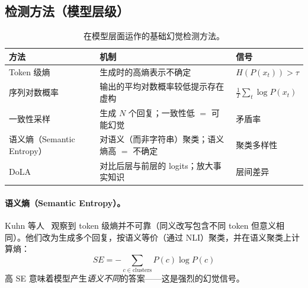 \subsection{检测方法（模型层级）}
\label{detection-methods-model-level}

\begin{table}[ht!]
\centering\small
\caption{在模型层面运作的基础幻觉检测方法。}
\noindent\begin{tabularx}{\linewidth}{@{}l Z{1} l@{}}
\toprule
\textbf{方法} & \textbf{机制} & \textbf{信号} \\
\midrule
Token 级熵 & 生成时的高熵表示不确定~\cite{kadavath2022language} & $H(P(x_t)) > \tau$ \\
序列对数概率 & 输出的平均对数概率较低提示存在虚构 & $\frac{1}{T}\sum_t \log P(x_t)$ \\
一致性采样 & 生成 $N$ 个回复；一致性低 $=$ 可能幻觉~\cite{manakul2023selfcheckgpt} & 矛盾率 \\
语义熵（Semantic Entropy） & 对语义（而非字符串）聚类；语义熵高 $=$ 不确定~\cite{kuhn2023semantic} & 聚类多样性 \\
DoLA & 对比后层与前层的 logits；放大事实知识~\cite{chuang2024dola} & 层间差异 \\
\bottomrule
\end{tabularx}
\end{table}

\paragraph{语义熵（Semantic Entropy）。}
\label{semantic-entropy.}

Kuhn 等人~\cite{kuhn2023semantic} 观察到 token 级熵并不可靠（同义改写包含不同 token 但意义相同）。他们改为生成多个回复，按语义等价（通过 NLI）聚类，并在语义聚类上计算熵：
\[
SE = -\sum_{c \in \text{clusters}} P(c) \log P(c)
\]
高 SE 意味着模型产生\emph{语义不同}的答案——这是强烈的幻觉信号。

